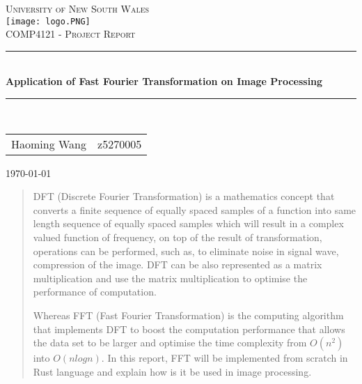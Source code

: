 \documentclass[12pt]{article}
\begin{document}
	
	\begin{titlepage}
		
		\newcommand{\HRule}{\rule{\linewidth}{0.5mm}}
		\centering
		
		\textsc{\LARGE University of New South Wales}\\[1.5cm]
		\texttt{[image: logo.PNG]}\\[1cm]
		\textsc{\Large COMP4121 - Project Report}\\[0.5cm] 
		
		\HRule \\[0.4cm]
		{ \huge \bfseries Application of Fast Fourier Transformation on Image Processing}\\[0.4cm] 
		\HRule \\[1.5cm]
		
	
		\begin{center}
			\begin{tabular}{ c      c } 
				Haoming Wang & z5270005
			\end{tabular}
		\end{center}
		
		\vfill
		{\large \today}\\[1cm] 
		\vfill 
		
	\end{titlepage}
	
	\begin{abstract}
		DFT (Discrete Fourier Transformation) is a mathematics concept that converts a finite sequence of equally spaced samples of a function into same length sequence of equally spaced samples which will result in a complex valued function of frequency, on top of the result of transformation, operations can be performed, such as, to eliminate noise in signal wave, compression of the image.
		DFT can be also represented as a matrix multiplication and use the matrix multiplication to optimise the performance of computation. 
		
		Whereas FFT (Fast Fourier Transformation) is the computing algorithm that implements DFT to boost the computation performance that allows the data set to be larger and optimise the time complexity from $O(n^2)$ into $O(nlogn)$.
		In this report, FFT will be implemented from scratch in Rust language and explain how is it be used in image processing.
	\end{abstract}
	
	\pagebreak
	
	\setcounter{page}{1}
	\thispagestyle{empty}
	\tableofcontents
	\pagebreak
	\setcounter{page}{1}
	
\end{document}
